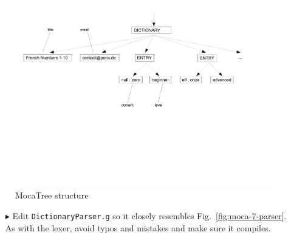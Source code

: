 \begin{figure}[htp]
\begin{center}
 \includegraphics[width=\textwidth]{pics/moca/2TextToMocaTree/5-tree}
  \caption{MocaTree structure}
  \label{fig:moca-5-Tree}
\end{center}
\end{figure}

\begin{enumerate}
\item[$\blacktriangleright$] Edit \texttt{DictionaryParser.g} so it closely resembles Fig.~\ref{fig:moca-7-parser}.
As with the lexer, avoid typos and mistakes and make sure it compiles.
\end{enumerate}

